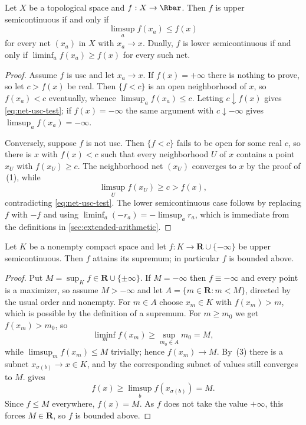 \begin{proposition}\label{prop:net-semicontinuity}
Let $X$ be a topological space and $f:X\to\Rbar$.  Then $f$ is upper
semicontinuous if and only if
\begin{equation}
\label{eq:net-usc-test}
 \limsup_a f(x_a)\leq f(x)
\end{equation}
for every net $(x_a)$ in $X$ with $x_a\to x$.  Dually, $f$ is lower
semicontinuous if and only if $\liminf_a f(x_a)\geq f(x)$ for every such net.
\end{proposition}

\begin{proof}
Assume $f$ is usc and let $x_a\to x$.  If $f(x)=+\infty$ there is nothing to
prove, so let $c>f(x)$ be real.  Then $\{f<c\}$ is an open neighborhood of
$x$, so $f(x_a)<c$ eventually, whence $\limsup_af(x_a)\leq c$.  Letting
$c\downarrow f(x)$ gives \eqref{eq:net-usc-test}; if $f(x)=-\infty$ the same
argument with $c\downarrow-\infty$ gives $\limsup_af(x_a)=-\infty$.

Conversely, suppose $f$ is not usc.  Then $\{f<c\}$ fails to be open for some
real $c$, so there is $x$ with $f(x)<c$ such that every neighborhood $U$ of
$x$ contains a point $x_U$ with $f(x_U)\geq c$.  The neighborhood net
$(x_U)$ converges to $x$ by the proof of \,(1),
while
\[
 \limsup_U f(x_U)\geq c>f(x),
\]
contradicting \eqref{eq:net-usc-test}.  The lower semicontinuous case follows
by replacing $f$ with $-f$ and using
$\liminf_a(-r_a)=-\limsup_a r_a$, which is immediate from the definitions in
\cref{sec:extended-arithmetic}.
\end{proof}

\begin{corollary}\label{cor:usc-attains-max}
Let $K$ be a nonempty compact space and let
$f:K\to\mathbf R\cup\{-\infty\}$ be upper semicontinuous.  Then $f$ attains
its supremum; in particular $f$ is bounded above.
\end{corollary}

\begin{proof}
Put $M=\sup_Kf\in\mathbf R\cup\{\pm\infty\}$.  If $M=-\infty$ then
$f\equiv-\infty$ and every point is a maximizer, so assume $M>-\infty$ and let
$A=\{m\in\mathbf R:m<M\}$, directed by the usual order and nonempty.  For
$m\in A$ choose $x_m\in K$ with $f(x_m)>m$, which is possible by the
definition of a supremum.  For $m\geq m_0$ we get $f(x_m)>m_0$, so
\[
 \liminf_{m}f(x_m)\geq\sup_{m_0\in A}m_0=M,
\]
while $\limsup_mf(x_m)\leq M$ trivially; hence $f(x_m)\to M$.  By
\,(3) there is a subnet $x_{\sigma(b)}\to x\in K$,
and by  the corresponding subnet of values still
converges to $M$.   gives
\[
 f(x)\geq\limsup_bf(x_{\sigma(b)})=M .
\]
Since $f\leq M$ everywhere, $f(x)=M$.  As $f$ does not take the value
$+\infty$, this forces $M\in\mathbf R$, so $f$ is bounded above.
\end{proof}

